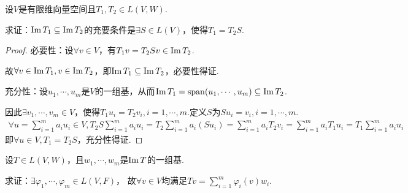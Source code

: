 \newpage

\begin{problem}[25]\label{3.B.25}
    设\(V\)是有限维向量空间且\(T_1,T_2 \in L(V,W)\).

    求证：\(\operatorname{Im} T_1 \subseteq \operatorname{Im} T_2\)的充要条件是\(\exists S \in L(V)\)，使得\(T_1=T_2S\).    
\end{problem}

\begin{proof}
    必要性：设\(\forall v \in V\)，有\(T_1v=T_2Sv \in \operatorname{Im} T_2\).

    故\(\forall v \in \operatorname{Im} T_1, v \in \operatorname{Im} T_2\)，即\(\operatorname{Im} T_1 \subseteq \operatorname{Im} T_2\)，必要性得证. 
    
    充分性：设\(u_1,\cdots,u_m\)是\(V\)的一组基，从而\(\operatorname{Im} T_1=\operatorname{span}(u_1,\cdots,u_m) \subseteq \operatorname{Im} T_2\).
    
    因此\(\exists v_1,\cdots,v_m \in V\)，使得\(T_1u_i=T_2v_i,i=1,\cdots,m\).定义\(S\)为\(Su_i=v_i,i=1,\cdots,m\).
    \begin{align*}
        \forall u=\sum_{i=1}^m a_iu_i \in V,T_2S\sum_{i=1}^m a_iu_i=T_2\sum_{i=1}^m a_i(Su_i)
        =\sum_{i=1}^m a_iT_2v_i=\sum_{i=1}^m a_iT_1u_i=T_1\sum_{i=1}^m a_iu_i
    \end{align*}
    即\(\forall u \in V , T_1=T_2S\)，充分性得证.    
\end{proof}

\begin{comment}
    \begin{problem}[26]\label{3.B.26}
        设\(D \in L(P(R))\)满足\(\forall p \in P(R),\altdeg Dp=\altdeg p-1\).求证：\(D\)是满射变换.
    \end{problem}

    \begin{proof}
        根据\probref{3.B.10}，命题等价于
        \begin{align*}
            \altspan (D(x),D(x^2),\cdots)=\Img D=P(R)=\altspan (1,x,\cdots)
        \end{align*}
        根据\probref{2.C.10}，由于\(\altdeg Dp=\altdeg p-1\)，

        故\(\altspan (D(x),D(x^2),\cdots)=\altspan (1,x,\cdots)\)成立.        
    \end{proof}
\end{comment}

\begin{problem}[28]\label{3.B.28}
    设\(T \in L(V,W)\)，且\(w_1,\cdots,w_m\)是\(\operatorname{Im} T\)的一组基.

    求证：\(\exists \varphi_1,\cdots,\varphi_m \in L(V,F)\)，
    故\(\forall v \in V\)均满足\(Tv=\sum_{i=1}^m{\varphi_i(v)w_i}\).
\end{problem}

